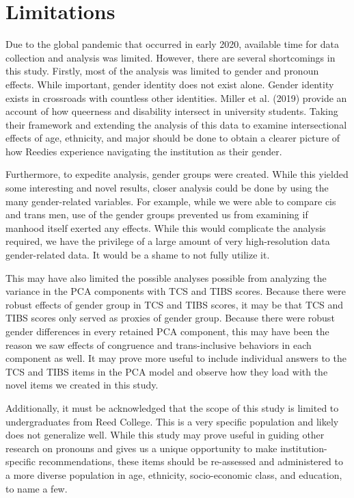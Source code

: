 \documentclass[12pt,twoside]{reedthesis}
\begin{document}
\hypertarget{limitations}{%
\section{Limitations}\label{limitations}}

Due to the global pandemic that occurred in early 2020, available time for data collection and analysis was limited. However, there are several shortcomings in this study. Firstly, most of the analysis was limited to gender and pronoun effects. While important, gender identity does not exist alone. Gender identity exists in crossroads with countless other identities. Miller et al. (2019) provide an account of how queerness and disability intersect in university students. Taking their framework and extending the analysis of this data to examine intersectional effects of age, ethnicity, and major should be done to obtain a clearer picture of how Reedies experience navigating the institution as their gender.

Furthermore, to expedite analysis, gender groups were created. While this yielded some interesting and novel results, closer analysis could be done by using the many gender-related variables. For example, while we were able to compare cis and trans men, use of the gender groups prevented us from examining if manhood itself exerted any effects. While this would complicate the analysis required, we have the privilege of a large amount of very high-resolution data gender-related data. It would be a shame to not fully utilize it.

This may have also limited the possible analyses possible from analyzing the variance in the PCA components with TCS and TIBS scores. Because there were robust effects of gender group in TCS and TIBS scores, it may be that TCS and TIBS scores only served as proxies of gender group. Because there were robust gender differences in every retained PCA component, this may have been the reason we saw effects of congruence and trans-inclusive behaviors in each component as well. It may prove more useful to include individual answers to the TCS and TIBS items in the PCA model and observe how they load with the novel items we created in this study.

Additionally, it must be acknowledged that the scope of this study is limited to undergraduates from Reed College. This is a very specific population and likely does not generalize well. While this study may prove useful in guiding other research on pronouns and gives us a unique opportunity to make institution-specific recommendations, these items should be re-assessed and administered to a more diverse population in age, ethnicity, socio-economic class, and education, to name a few.
\end{document}
